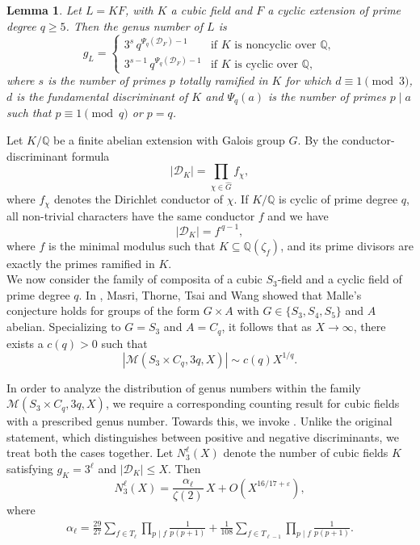 \documentclass[11pt,reqno]{amsart}
\newcommand{\Q}{\mathbb{Q}}
\newcommand{\cM}{\mathcal{M}}
\newtheorem{lemma}[theorem]{Lemma}
\theoremstyle{definition}
\theoremstyle{remark}
\begin{document}
\begin{lemma}\label{genusnumber:S3Cq}
Let $L=KF$, with $K$ a cubic field and $F$ a cyclic extension of prime degree $q\ge 5$. Then the genus number of $L$ is
\begin{equation*}
    g_L =
    \begin{cases}
        3^{s}\, q^{\Psi_q(\mathcal{D}_F)-1}   & \text{if $K$ is noncyclic over $\mathbb{Q}$}, \\[4pt]
        3^{s-1}\, q^{\Psi_q(\mathcal{D}_F)-1} & \text{if $K$ is cyclic over $\mathbb{Q}$},
    \end{cases}
\end{equation*}
where $s$ is the number of primes $p$ totally ramified in $K$ for which  $d\equiv 1\pmod{3}$, $d$ is the fundamental discriminant of $K$
and  $\Psi_q(a)$ is the number of primes $p\mid a$ such that $p\equiv 1 \pmod q$ or $p=q$.
\end{lemma}

Let $K/\mathbb{Q}$ be a finite abelian extension with Galois group 
$G$. By the conductor-discriminant formula
$$
    |\mathcal{D}_{K}|
    = \prod_{\chi\in\widehat{G}} f_\chi,
$$
where $f_{\chi}$ denotes the Dirichlet conductor of $\chi$. If $K/\mathbb{Q}$ is cyclic of prime degree $q$, all non-trivial characters have the same conductor $f$ and we have
\[
    |\mathcal{D}_{K}| = f^{\,q-1},
\]
where $f$ is the minimal modulus such that $K\subseteq \Q(\zeta_f)$, and its prime divisors are exactly the primes ramified in $K$.\\

We now consider the family of composita of a cubic $S_3$-field and a cyclic field of prime degree $q$. In \cite[Theorem 1.1]{MasriThorneTsaiWang2020}, Masri, Thorne, Tsai and Wang showed that Malle’s conjecture holds for groups of the form $G \times A$ with $G \in \{S_3, S_4, S_5\}$ and $A$ abelian.  Specializing to $G=S_3$ and $A=C_q$, it follows that as $X\to\infty$, there exists a $c(q)>0$ such that
\begin{equation*}
    |\cM(S_3\times C_q, 3q, X)|\sim c(q) X^{1/q}.
\end{equation*}

In order to analyze the distribution of genus numbers within the family
$\cM(S_3\times C_q, 3q, X)$, we require a corresponding counting result for cubic fields with a prescribed genus number.  Towards this, we invoke \cite[Theorem~1.3]{cubicwithgenusnumber1}. Unlike the original statement, which distinguishes between positive and negative
discriminants, we treat both the cases together. Let $N_3^{\ell}(X)$ denote the number of cubic fields $K$ satisfying $g_K = 3^{\ell}$ and $|\mathcal{D}_K|\le X$. Then
\begin{equation}\label{lemma:count-genus-number-S_3}
    N_3^{\ell}(X)
    = \frac{\alpha_{\ell}}{\zeta(2)}\,X
      + O\!\left(X^{16/17+\varepsilon}\right),
\end{equation}
where 
\begin{align*}
	\alpha_{\ell}=\frac{29}{27} \sum_{f \in T_{\ell}} \prod_{p \mid f} \frac{1}{p(p+1)}
	+ \frac{1}{108} \sum_{f \in T_{\ell-1}} \prod_{p \mid f} \frac{1}{p(p+1)}.
\end{align*}
 
\end{document}

